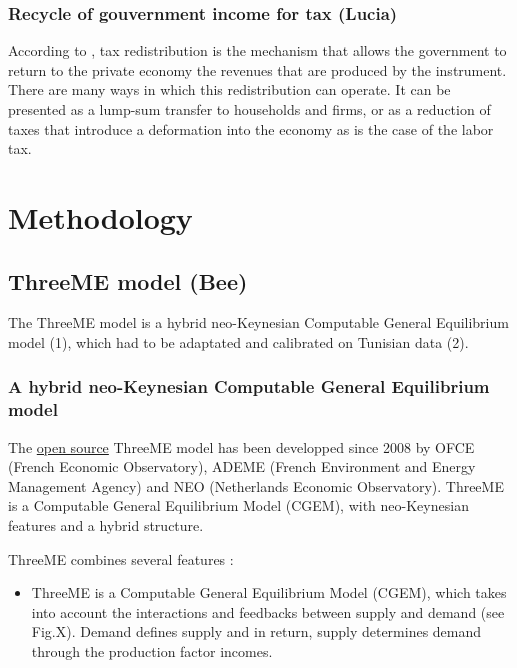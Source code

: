 \documentclass[
]{article}
\providecommand{\tightlist}{%
  \setlength{\itemsep}{0pt}\setlength{\parskip}{0pt}}
\begin{document}
\hypertarget{recycle-of-gouvernment-income-for-tax-lucia}{%
\subsubsection{Recycle of gouvernment income for tax
(Lucia)}\label{recycle-of-gouvernment-income-for-tax-lucia}}

According to \textcite{goulder}, tax redistribution is the mechanism
that allows the government to return to the private economy the revenues
that are produced by the instrument. There are many ways in which this
redistribution can operate. It can be presented as a lump-sum transfer
to households and firms, or as a reduction of taxes that introduce a
deformation into the economy as is the case of the labor tax.

\hypertarget{methodology}{%
\section{Methodology}\label{methodology}}

\hypertarget{threeme-model-bee}{%
\subsection{ThreeME model (Bee)}\label{threeme-model-bee}}

The ThreeME model is a hybrid neo-Keynesian Computable General
Equilibrium model (1), which had to be adaptated and calibrated on
Tunisian data (2).

\hypertarget{a-hybrid-neo-keynesian-computable-general-equilibrium-model}{%
\subsubsection{A hybrid neo-Keynesian Computable General Equilibrium
model}\label{a-hybrid-neo-keynesian-computable-general-equilibrium-model}}

The \href{https://github.com/fosem/ThreeME_V3-open}{open source} ThreeME
model has been developped since 2008 by OFCE (French Economic
Observatory), ADEME (French Environment and Energy Management Agency)
and NEO (Netherlands Economic Observatory). ThreeME is a Computable
General Equilibrium Model (CGEM), with neo-Keynesian features and a
hybrid structure.

ThreeME combines several features \autocites[
]{callonnec2013}{callonnec2021} :

\begin{itemize}
\tightlist
\item
  ThreeME is a Computable General Equilibrium Model (CGEM), which takes
  into account the interactions and feedbacks between supply and demand
  (see Fig.X). Demand defines supply and in return, supply determines
  demand through the production factor incomes.
\end{itemize}
\end{document}
